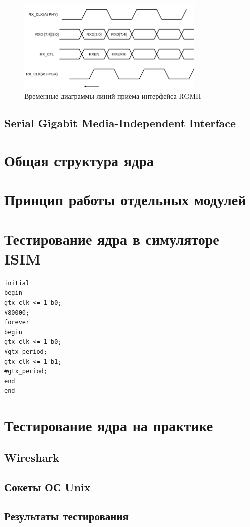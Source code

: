 \begin{figure}[!ht]
	\centering
	\includegraphics[width=0.8\textwidth]{image/RX_RGMII}
	\caption{Временные диаграммы линий приёма интерфейса RGMII}
	\label{TX_RGMII}
\end{figure}

\subsection{Serial Gigabit Media-Independent Interface}

\section{Общая структура ядра}

\section{Принцип работы отдельных модулей}

\section{Тестирование ядра в симуляторе ISIM}

\begin{Verbatim}[tabsize=4]
initial
begin
gtx_clk <= 1'b0;
#80000;
forever
begin
gtx_clk <= 1'b0;
#gtx_period;
gtx_clk <= 1'b1;
#gtx_period;
end
end
\end{Verbatim}

\section{Тестирование ядра на практике}

\subsection{Wireshark}

\subsection{Сокеты ОС Unix}

\subsection{Результаты тестирования}